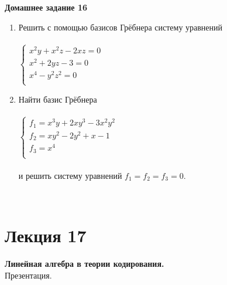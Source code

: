 \documentclass[12pt]{article}
\theoremstyle{definition}
\numberwithin{equation}{section}
\begin{document}
\textbf{Домашнее задание 16}\begin{enumerate}
\item Решить с помощью базисов Грёбнера систему уравнений\\ \\
$
\left\{
\begin{array}{lcl}
    x^2y+x^2z-2xz=0\\
    x^2+2yz-3=0\\
    x^4-y^2z^2=0\\
\end{array}
\right.
$
\item Найти базис Грёбнера\\ \\
$
\left\{
\begin{array}{lcl}
    f_1=x^3y+2xy^3-3x^2y^2\\
    f_2=xy^2-2y^2+x-1\\
    f_3=x^4\\
\end{array}
\right.
$
\\ \\и решить систему уравнений $f_1=f_2=f_3=0$.
\end{enumerate}
~\\
\section *{Лекция 17}
\noindent\textbf{Линейная алгебра в теории кодирования.}\\
Презентация.\\
\end{document}
